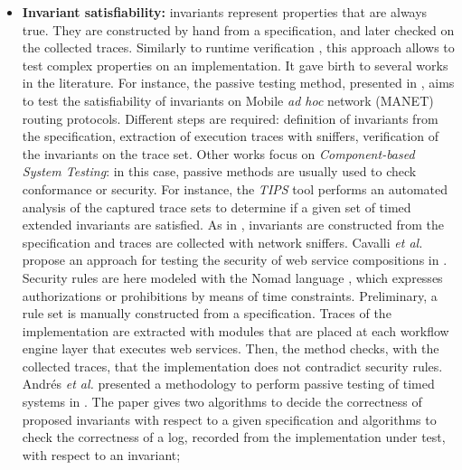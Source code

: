 \begin{itemize}

    \item \textbf{Invariant satisfiability:} invariants represent
        properties that are always true. They are constructed by
        hand from a specification, and later checked on the
        collected traces. Similarly to runtime verification
        \cite{Leucker2009293}, this approach allows to test
        complex properties on an implementation. It gave birth to
        several works in the literature. For instance, the
        passive testing method, presented in \cite{CMdO09}, aims
        to test the satisfiability of invariants on Mobile
        \emph{ad hoc}
        network (MANET) routing protocols.  Different steps are
        required: definition of invariants from the
        specification, extraction of execution traces with
        sniffers, verification of the invariants on the trace
        set. Other works focus on \emph{Component-based System
        Testing}: in this case, passive methods are usually used
        to check conformance or security. For instance, the
        \textit{TIPS} tool \cite{5552735} performs an automated
        analysis of the captured trace sets to determine if a
        given set of timed extended invariants are satisfied. As
        in \cite{CMdO09}, invariants are constructed from the
        specification and traces are collected with network
        sniffers. Cavalli \emph{et al.} propose an approach for
        testing the security of web service compositions in
        \cite{cavalli2009passive}. Security rules are here
        modeled with the Nomad language \cite{cuppens2005nomad},
        which expresses authorizations or prohibitions by means
        of time constraints. Preliminary, a rule set is manually
        constructed from a specification. Traces of the
        implementation are extracted with modules that are placed
        at each workflow engine layer that executes web services.
        Then, the method checks, with the collected traces, that
        the implementation does not contradict security rules.
        Andrés \emph{et al.} presented a methodology to perform
        passive testing of timed systems in
        \cite{andres2012formal}. The paper gives two algorithms
        to decide the correctness of proposed invariants with
        respect to a given specification and algorithms to check
        the correctness of a log, recorded from the
        implementation under test, with respect to an invariant;


\end{itemize}
